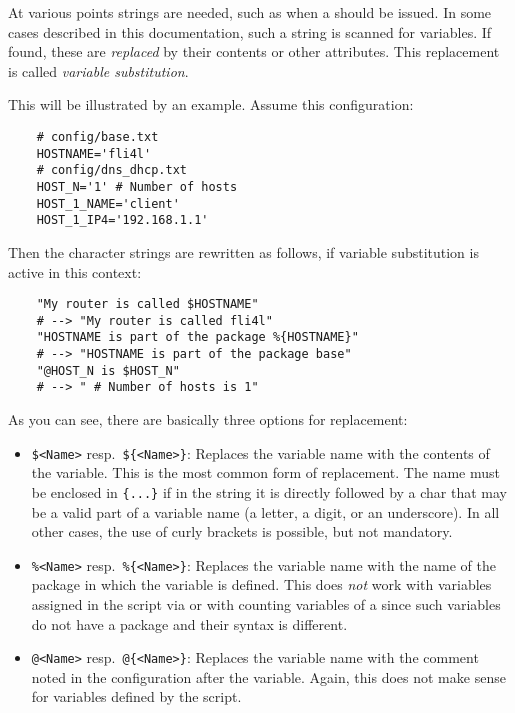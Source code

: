     At various points strings are needed, such as when a
     should be issued. In some cases
    described in this documentation, such a string is scanned for variables.
    If found, these are \emph{replaced} by their contents or other attributes.
    This replacement is called \emph{variable substitution}.

    This will be illustrated by an example. Assume this configuration:

\begin{example}
\begin{verbatim}
    # config/base.txt
    HOSTNAME='fli4l'
    # config/dns_dhcp.txt
    HOST_N='1' # Number of hosts
    HOST_1_NAME='client'
    HOST_1_IP4='192.168.1.1'
\end{verbatim}
\end{example}

    Then the character strings are rewritten as follows, if
    variable substitution is active in this context:

\begin{example}
\begin{verbatim}
    "My router is called $HOSTNAME"
    # --> "My router is called fli4l"
    "HOSTNAME is part of the package %{HOSTNAME}"
    # --> "HOSTNAME is part of the package base"
    "@HOST_N is $HOST_N"
    # --> " # Number of hosts is 1"
\end{verbatim}
\end{example}

    As you can see, there are basically three options for replacement:
    \begin{itemize}
    \item \texttt{\$<Name>} resp.\ \texttt{\$\{<Name>\}}: Replaces the
          variable name with the contents of the variable. This is the most common
          form of replacement. The name must be enclosed in \texttt{\{...\}} if in
          the string it is directly followed by a char that may be a valid part of
          a variable name (a letter, a digit, or an underscore). In all other cases,
          the use of curly brackets is possible, but not mandatory.

    \item \texttt{\%<Name>} resp.\ \texttt{\%\{<Name>\}}: Replaces the variable name
	  with the name of the package in which the variable is defined. This does
	  \emph{not} work with variables assigned in the script via
           or with counting
          variables of a 
          since such variables do not have a package and their syntax is different.

    \item \texttt{@<Name>} resp.\ \texttt{@\{<Name>\}}: Replaces the
          variable name with the comment noted in the configuration after the variable.
          Again, this does not make sense for variables defined by the script.
    \end{itemize}

